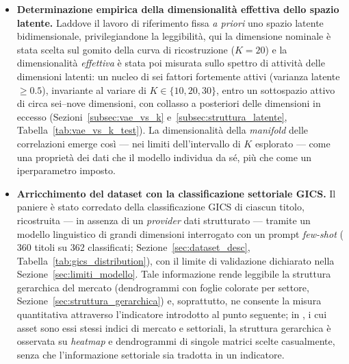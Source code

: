 \begin{itemize}
    \item \textbf{Determinazione empirica della dimensionalità effettiva dello spazio latente.} Laddove il lavoro di riferimento fissa \emph{a priori} uno spazio latente bidimensionale, privilegiandone la leggibilità, qui la dimensione nominale è stata scelta sul gomito della curva di ricostruzione ($K=20$) e la dimensionalità \emph{effettiva} è stata poi misurata sullo spettro di attività delle dimensioni latenti: un nucleo di sei fattori fortemente attivi (varianza latente $\geq 0.5$), invariante al variare di $K \in \{10, 20, 30\}$, entro un sottospazio attivo di circa sei--nove dimensioni, con collasso a posteriori delle dimensioni in eccesso (Sezioni~\ref{subsec:vae_vs_k} e~\ref{subsec:struttura_latente}, Tabella~\ref{tab:vae_vs_k_test}). La dimensionalità della \emph{manifold} delle correlazioni emerge così --- nei limiti dell'intervallo di $K$ esplorato --- come una proprietà dei dati che il modello individua da sé, più che come un iperparametro imposto.
    \item \textbf{Arricchimento del dataset con la classificazione settoriale GICS.} Il paniere è stato corredato della classificazione GICS di ciascun titolo, ricostruita --- in assenza di un \emph{provider} dati strutturato --- tramite un modello linguistico di grandi dimensioni interrogato con un prompt \emph{few-shot} ($360$ titoli su $362$ classificati; Sezione~\ref{sec:dataset_desc}, Tabella~\ref{tab:gics_distribution}), con il limite di validazione dichiarato nella Sezione~\ref{sec:limiti_modello}. Tale informazione rende leggibile la struttura gerarchica del mercato (dendrogrammi con foglie colorate per settore, Sezione~\ref{sec:struttura_gerarchica}) e, soprattutto, ne consente la misura quantitativa attraverso l'indicatore introdotto al punto seguente; in \citet{caprioli2024ptfvae}, i cui asset sono essi stessi indici di mercato e settoriali, la struttura gerarchica è osservata su \emph{heatmap} e dendrogrammi di singole matrici scelte casualmente, senza che l'informazione settoriale sia tradotta in un indicatore.

\end{itemize}
